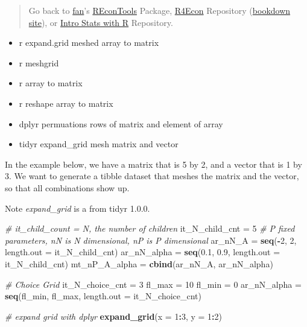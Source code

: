 \documentclass[
]{book}
\newenvironment{Shaded}{\begin{snugshade}}{\end{snugshade}}
\newcommand{\CommentTok}[1]{\textcolor[rgb]{0.56,0.35,0.01}{\textit{#1}}}
\newcommand{\DataTypeTok}[1]{\textcolor[rgb]{0.13,0.29,0.53}{#1}}
\newcommand{\DecValTok}[1]{\textcolor[rgb]{0.00,0.00,0.81}{#1}}
\newcommand{\FloatTok}[1]{\textcolor[rgb]{0.00,0.00,0.81}{#1}}
\newcommand{\KeywordTok}[1]{\textcolor[rgb]{0.13,0.29,0.53}{\textbf{#1}}}
\newcommand{\NormalTok}[1]{#1}
\newcommand{\OperatorTok}[1]{\textcolor[rgb]{0.81,0.36,0.00}{\textbf{#1}}}
\newcommand{\StringTok}[1]{\textcolor[rgb]{0.31,0.60,0.02}{#1}}
\providecommand{\tightlist}{%
  \setlength{\itemsep}{0pt}\setlength{\parskip}{0pt}}
\begin{document}
\begin{quote}
Go back to \href{http://fanwangecon.github.io/CodeDynaAsset/}{fan}'s \href{https://fanwangecon.github.io/REconTools/}{REconTools} Package, \href{https://fanwangecon.github.io/R4Econ/}{R4Econ} Repository (\href{https://fanwangecon.github.io/R4Econ/bookdown}{bookdown site}), or \href{https://fanwangecon.github.io/Stat4Econ/}{Intro Stats with R} Repository.
\end{quote}

\begin{itemize}
\tightlist
\item
  r expand.grid meshed array to matrix
\item
  r meshgrid
\item
  r array to matrix
\item
  r reshape array to matrix
\item
  dplyr permuations rows of matrix and element of array
\item
  tidyr expand\_grid mesh matrix and vector
\end{itemize}

In the example below, we have a matrix that is 5 by 2, and a vector that is 1 by 3. We want to generate a tibble dataset that meshes the matrix and the vector, so that all combinations show up.

Note \emph{expand\_grid} is a from tidyr 1.0.0.

\begin{Shaded}
\begin{Highlighting}[]
\CommentTok{# it_child_count = N, the number of children}
\NormalTok{it_N_child_cnt =}\StringTok{ }\DecValTok{5}
\CommentTok{# P fixed parameters, nN is N dimensional, nP is P dimensional}
\NormalTok{ar_nN_A =}\StringTok{ }\KeywordTok{seq}\NormalTok{(}\OperatorTok{-}\DecValTok{2}\NormalTok{, }\DecValTok{2}\NormalTok{, }\DataTypeTok{length.out =}\NormalTok{ it_N_child_cnt)}
\NormalTok{ar_nN_alpha =}\StringTok{ }\KeywordTok{seq}\NormalTok{(}\FloatTok{0.1}\NormalTok{, }\FloatTok{0.9}\NormalTok{, }\DataTypeTok{length.out =}\NormalTok{ it_N_child_cnt)}
\NormalTok{mt_nP_A_alpha =}\StringTok{ }\KeywordTok{cbind}\NormalTok{(ar_nN_A, ar_nN_alpha)}

\CommentTok{# Choice Grid}
\NormalTok{it_N_choice_cnt =}\StringTok{ }\DecValTok{3}
\NormalTok{fl_max =}\StringTok{ }\DecValTok{10}
\NormalTok{fl_min =}\StringTok{ }\DecValTok{0}
\NormalTok{ar_nN_alpha =}\StringTok{ }\KeywordTok{seq}\NormalTok{(fl_min, fl_max, }\DataTypeTok{length.out =}\NormalTok{ it_N_choice_cnt)}

\CommentTok{# expand grid with dplyr}
\KeywordTok{expand_grid}\NormalTok{(}\DataTypeTok{x =} \DecValTok{1}\OperatorTok{:}\DecValTok{3}\NormalTok{, }\DataTypeTok{y =} \DecValTok{1}\OperatorTok{:}\DecValTok{2}\NormalTok{)}
\end{Highlighting}
\end{Shaded}
\end{document}
